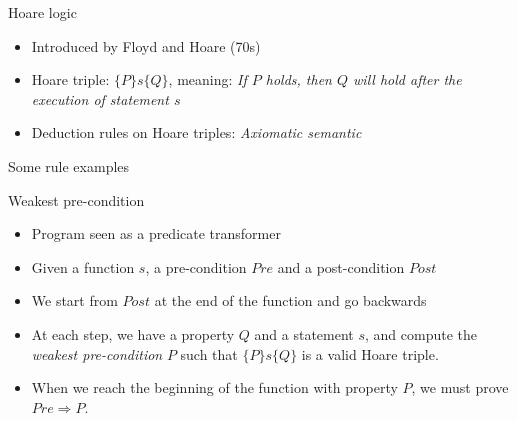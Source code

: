 \documentclass[pdf]{beamer}
\begin{document}
\begin{frame}{Hoare logic}
\begin{itemize}
\item Introduced by Floyd and Hoare (70s)
\item Hoare triple: $\{P\}s\{Q\}$, meaning: \emph{If $P$ holds, then
  $Q$ will hold after the execution of statement $s$}
\item Deduction rules on Hoare triples: \emph{Axiomatic semantic}
\end{itemize}
\end{frame}

\begin{frame}[fragile]{Some rule examples}
\end{frame}

\begin{frame}{Weakest pre-condition}
\begin{itemize}
\item<+->Program seen as a \alert{predicate transformer}
\item<+->Given a function $s$, a pre-condition $Pre$ and a
  post-condition $Post$
\item<+->We start from $Post$ at the end of the function and go backwards
\item<+->At each step, we have a property $Q$ and a statement $s$, and
  compute the \emph{weakest pre-condition} $P$ such that $\{P\}s\{Q\}$
  is a valid Hoare triple.
\item<+->When we reach the beginning of the function with property
  $P$, we must prove $Pre\Rightarrow P$.
\end{itemize}
\end{frame}
\end{document}
